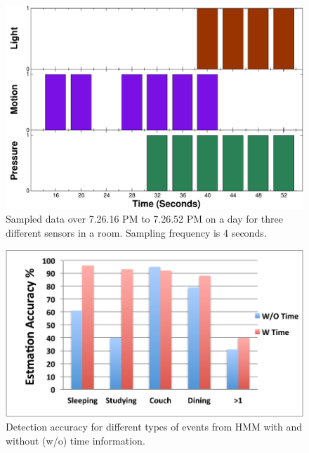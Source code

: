 \documentclass[10pt, conference, compsocconf]{IEEEtran}
\begin{document}
\begin{figure}
\begin{center}
\includegraphics[width=0.7\columnwidth]{event-tv-crop}
\end{center}
\caption{Sampled data over 7.26.16 PM to 7.26.52 PM on a day for three different sensors in a room. Sampling frequency is 4 seconds.}
\label{fig:data}
\vspace{-4pt}
\end{figure}

\begin{figure}
\begin{center}
\includegraphics[width=0.7\columnwidth]{plot1-crop}
\end{center}
\caption{Detection accuracy for different types of events from HMM with and without (w/o) time information.}
\label{fig:plot1-crop}
\end{figure}
\end{document}
